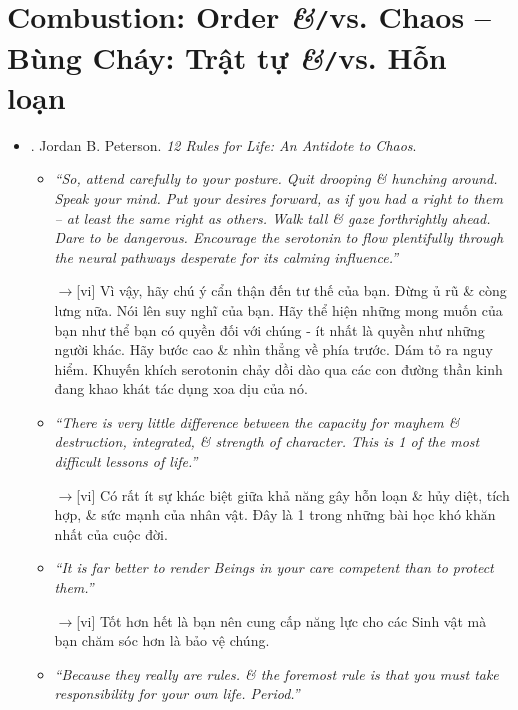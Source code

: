 \documentclass[12pt,twoside]{book}
\begin{document}
\chapter{Combustion: Order {\it\&}{\tt/}vs. Chaos -- Bùng Cháy: Trật tự {\it\&}{\tt/}vs. Hỗn loạn}
\minitoc
{}
\begin{itemize}
	\item \cite{Peterson_rule}. {\sc Jordan B. Peterson}. {\it 12 Rules for Life: An Antidote to Chaos}.
	\begin{itemize}
		\item {\it``So, attend carefully to your posture. Quit drooping \& hunching around. Speak your mind. Put your desires forward, as if you had a right to them -- at least the same right as others. Walk tall \& gaze forthrightly ahead. Dare to be dangerous. Encourage the serotonin to flow plentifully through the neural pathways desperate for its calming influence.''}
		
		{\sf[en]$\to$[vi]} Vì vậy, hãy chú ý cẩn thận đến tư thế của bạn. Đừng ủ rũ \& còng lưng nữa. Nói lên suy nghĩ của bạn. Hãy thể hiện những mong muốn của bạn như thể bạn có quyền đối với chúng - ít nhất là quyền như những người khác. Hãy bước cao \& nhìn thẳng về phía trước. Dám tỏ ra nguy hiểm. Khuyến khích serotonin chảy dồi dào qua các con đường thần kinh đang khao khát tác dụng xoa dịu của nó.
		
		\item {\it``There is very little difference between the capacity for mayhem \& destruction, integrated, \& strength of character. This is 1 of the most difficult lessons of life.''}
		
		{\sf[en]$\to$[vi]} Có rất ít sự khác biệt giữa khả năng gây hỗn loạn \& hủy diệt, tích hợp, \& sức mạnh của nhân vật. Đây là 1 trong những bài học khó khăn nhất của cuộc đời.
		
		\item {\it``It is far better to render Beings in your care competent than to protect them.''}
		
		{\sf[en]$\to$[vi]} Tốt hơn hết là bạn nên cung cấp năng lực cho các Sinh vật mà bạn chăm sóc hơn là bảo vệ chúng.
		
		\item {\it``Because they really are rules. \& the foremost rule is that you must take responsibility for your own life. Period.''}
		

\end{itemize}
\end{itemize}
\end{document}
